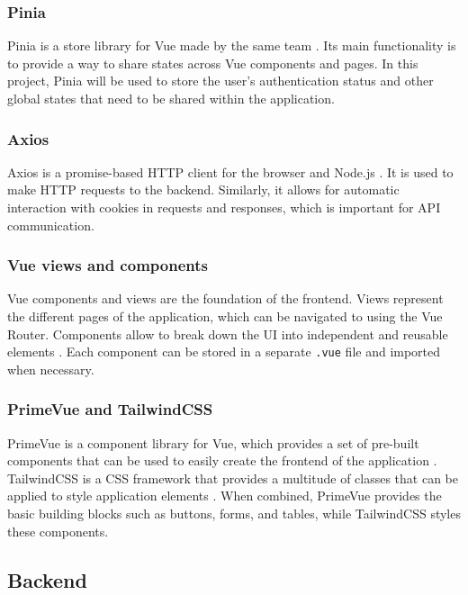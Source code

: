 \subsubsection{Pinia}

Pinia is a store library for Vue made by the same team \parencite{pinia}. Its main functionality is to provide a way to share states across Vue components and pages. In this project, Pinia will be used to store the user's authentication status and other global states that need to be shared within the application.

\subsubsection{Axios}

Axios is a promise-based HTTP client for the browser and Node.js \parencite{axios}. It is used to make HTTP requests to the backend. Similarly, it allows for automatic interaction with cookies in requests and responses, which is important for API communication.

\subsubsection{Vue views and components}

Vue components and views are the foundation of the frontend. Views represent the different pages of the application, which can be navigated to using the Vue Router. Components allow to break down the UI into independent and reusable elements \parencite{vuecomponents}. Each component can be stored in a separate \lstinline{.vue} file and imported when necessary.

\subsubsection{PrimeVue and TailwindCSS}

PrimeVue is a component library for Vue, which provides a set of pre-built components that can be used to easily create the frontend of the application \parencite{primevue}. TailwindCSS is a CSS framework that provides a multitude of classes that can be applied to style application elements \parencite{tailwind}. When combined, PrimeVue provides the basic building blocks such as buttons, forms, and tables, while TailwindCSS styles these components.

\subsection{Backend}

